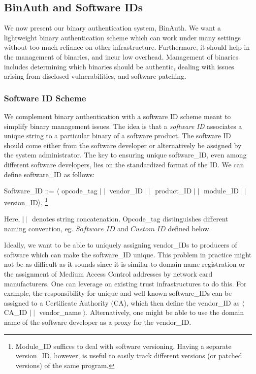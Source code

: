 \subsection{BinAuth and Software IDs}
\label{sec:binauth-scheme}

We now present our binary authentication system, BinAuth.
We want a lightweight binary authentication scheme which can work
under many settings without too much reliance on other infrastructure.
Furthermore, it should help in the management of binaries, and incur low overhead.
Management of binaries includes determining which binaries should be
authentic, dealing with issues arising from disclosed vulnerabilities,
and software patching.

\subsubsection{Software ID Scheme}


We complement binary authentication with a software ID scheme meant
to simplify binary management issues.
The idea is that a {\em software ID} associates a
unique string to a particular binary of a software product.
The software ID should come either from the software developer
or alternatively be assigned by the system administrator.
The key to ensuring unique software\_ID, even among different
software developers, lies on the standardized format of the ID.
We can define software\_ID as follows:
\begin{center}
\small
Software\_ID ::= $\langle$ opcode\_tag $\mid\mid$ vendor\_ID $\mid\mid$ 
product\_ID $\mid\mid$ module\_ID $\mid\mid$ version\_ID$\rangle$.
\footnote{Module\_ID suffices to deal with software versioning.
Having a separate version\_ID, however, is useful to easily
track different versions (or patched versions) of the same program.}
\end{center}
\noindent 
Here, $\mid\mid$ denotes string concatenation.
Opcode\_tag distinguishes different naming convention, eg.
$Software\_ID$ and $Custom\_ID$ defined below.

Ideally, we want to be able to uniquely assigning vendor\_IDs to
producers of software which can make the software\_ID unique.
This problem in practice might not be as difficult as it sounds since
it is similar to domain name registration or the assignment
of Medium Access Control addresses by network card manufacturers.
One can leverage on existing trust infrastructures to do this.
For example, the responsibility for unique and well known software\_IDs
can be assigned to a Certificate Authority (CA), which then 
define the vendor\_ID as $\langle$ CA\_ID $\mid\mid$ vendor\_name $\rangle$. 
Alternatively, one might be able to use the domain name of the 
software developer as a proxy for the vendor\_ID.

